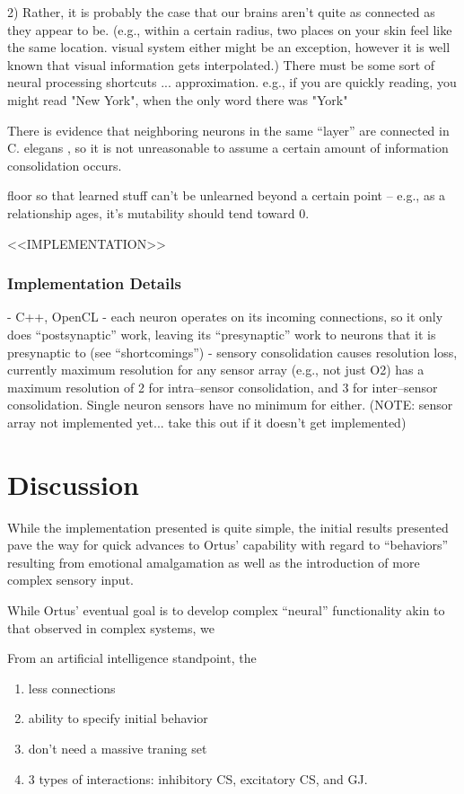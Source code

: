 \documentclass[letterpaper]{article}
\begin{document}
2) Rather, it is probably the case that our brains aren't quite as connected as they appear to be. (e.g., within a certain radius, two places on your skin feel like the same location. visual system either might be an exception, however it is well known that visual information gets interpolated.)
There must be some sort of neural processing shortcuts ... approximation. e.g., if you are quickly reading, you might read "New York", when the only word there was "York"

There is evidence that neighboring neurons in the same ``layer'' are connected in C. elegans \citep{Azulay2016}, so it is not unreasonable to assume a certain amount of information consolidation occurs.


floor so that learned stuff can't be unlearned beyond a certain point -- e.g., as a relationship ages, it's mutability should tend toward 0.

<<IMPLEMENTATION>>
\subsubsection{Implementation Details}
- C++, OpenCL
- each neuron operates on its incoming connections, so it only does ``postsynaptic'' work, leaving its ``presynaptic'' work to neurons that it is presynaptic to (see ``shortcomings'')
- sensory consolidation causes resolution loss, currently maximum resolution for any sensor array (e.g., not just O2) has a maximum resolution of 2 for intra--sensor consolidation, and 3 for inter--sensor consolidation. Single neuron sensors have no minimum for either. (NOTE: sensor array not implemented yet... take this out if it doesn't get implemented)

\section{Discussion}
While the implementation presented is quite simple, the initial results presented pave the way for quick advances to Ortus' capability with regard to ``behaviors'' resulting from emotional amalgamation as well as the introduction of more complex sensory input.


While Ortus' eventual goal is to develop complex ``neural'' functionality akin to that observed in complex systems, we


From an artificial intelligence standpoint, the

\begin{enumerate}
\item less connections
\item ability to specify initial behavior
\item don't need a massive traning set
\item 3 types of interactions: inhibitory CS, excitatory CS, and GJ.
\end{enumerate}
\end{document}
